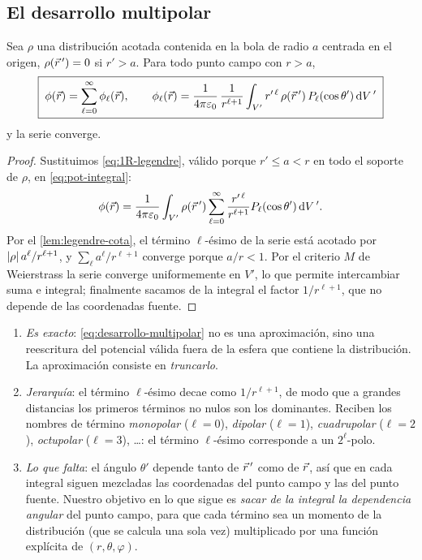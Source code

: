 \subsection{El desarrollo multipolar}\label{sec:desarrollo}
\begin{teorema}\label{teo:multipolar}
Sea $\rho$ una distribución acotada contenida en la bola de radio $a$ centrada en el origen, $\rho(\vec{r}\,')=0$ si $r'>a$. Para todo punto campo con $r>a$,
\begin{equation}\label{eq:desarrollo-multipolar}
  \boxed{\;\phi(\vec{r})=\sum_{\ell=0}^{\infty}\phi_{\ell}(\vec{r}),\qquad
  \phi_{\ell}(\vec{r})=\frac{1}{4\pi\varepsilon_{0}}\,\frac{1}{r^{\ell+1}}\int_{V'}r'^{\,\ell}\,\rho(\vec{r}\,')\,P_{\ell}(\cos\theta')\,\mathrm{d} V\,'\;}
\end{equation}
y la serie converge.
\end{teorema}
\begin{proof}
Sustituimos \cref{eq:1R-legendre}, válido porque $r'\le a<r$ en todo el soporte de $\rho$, en \cref{eq:pot-integral}:
\[
  \phi(\vec{r})=\frac{1}{4\pi\varepsilon_{0}}\int_{V'}\rho(\vec{r}\,')\sum_{\ell=0}^{\infty}\frac{r'^{\,\ell}}{r^{\ell+1}}P_{\ell}(\cos\theta')\,\mathrm{d} V\,' .
\]
Por el \cref{lem:legendre-cota}, el término $\ell$-ésimo de la serie está acotado por $\lvert \rho\rvert\,a^{\ell}/r^{\ell+1}$, y $\sum_\ell a^{\ell}/r^{\ell+1}$ converge
porque $a/r<1$. Por el criterio $M$ de Weierstrass la serie converge uniformemente en $V'$, lo que permite intercambiar suma e integral; finalmente sacamos de la integral
el factor $1/r^{\ell+1}$, que no depende de las coordenadas fuente.
\end{proof}

\begin{observacion}\label{obs:lectura}
\begin{enumerate}[label=(\alph*)]
  \item \emph{Es exacto}: \cref{eq:desarrollo-multipolar} no es una aproximación, sino una reescritura del potencial válida fuera de la esfera que contiene la
        distribución. La aproximación consiste en \emph{truncarlo}.
  \item \emph{Jerarquía}: el término $\ell$-ésimo decae como $1/r^{\ell+1}$, de modo que a grandes distancias los primeros términos no nulos son los dominantes.
        Reciben los nombres de término \emph{monopolar} ($\ell=0$), \emph{dipolar} ($\ell=1$), \emph{cuadrupolar} ($\ell=2$), \emph{octupolar} ($\ell=3$), \dots: el
        término $\ell$-ésimo corresponde a un $2^{\ell}$-polo.
  \item \emph{Lo que falta}: el ángulo $\theta'$ depende tanto de $\vec{r}\,'$ como de $\vec{r}$, así que en cada integral siguen mezcladas las coordenadas del punto campo
        y las del punto fuente. Nuestro objetivo en lo que sigue es \emph{sacar de la integral la dependencia angular} del punto campo, para que cada término sea un
        momento de la distribución (que se calcula una sola vez) multiplicado por una función explícita de $(r,\theta,\varphi)$.
\end{enumerate}
\end{observacion}

